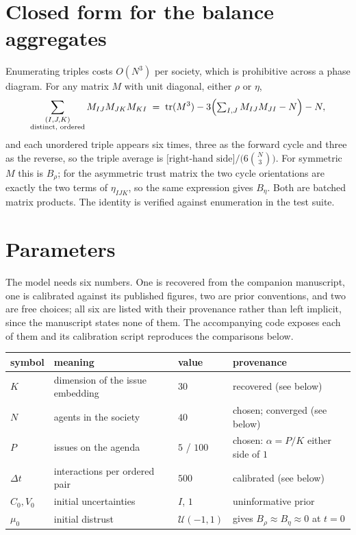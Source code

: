 \documentclass{article}
\newcommand{\Brho}{B_{\rho}}
\newcommand{\Beta}{B_{\eta}}
\begin{document}
\section{Closed form for the balance aggregates}
\label{app:closed-form}

Enumerating triples costs $O(N^{3})$ per society, which is prohibitive across a
phase diagram. For any matrix $M$ with unit diagonal, either $\rho$ or $\eta$,
%
\begin{equation}
  \sum_{\substack{(I,J,K)\\ \text{distinct, ordered}}} M_{IJ}M_{JK}M_{KI}
  \;=\; \operatorname{tr}(M^{3}) - 3\Bigl(\textstyle\sum_{I,J}M_{IJ}M_{JI} - N\Bigr) - N ,
\end{equation}
%
and each unordered triple appears six times, three as the forward cycle and three
as the reverse, so
the triple average is $\bigl[\text{right-hand side}\bigr]/\bigl(6\binom{N}{3}\bigr)$.
For symmetric $M$ this is $\Brho$; for the asymmetric trust matrix the two cycle
orientations are exactly the two terms of $\eta_{IJK}$, so the same expression gives
$\Beta$. Both are batched matrix products. The identity is verified against
enumeration in the test suite.

\section{Parameters}
\label{app:parameters}

The model needs six numbers. One is recovered from the companion manuscript, one
is calibrated against its published figures, two are prior conventions, and two
are free choices; all six are listed with their provenance rather than left
implicit, since the manuscript states none of them. The accompanying code exposes
each of them and its calibration script reproduces the comparisons below.

\begin{table}[h]
\centering\small
\begin{tabular}{llll}
\toprule
symbol & meaning & value & provenance \\
\midrule
$K$ & dimension of the issue embedding & $30$ & recovered (see below) \\
$N$ & agents in the society & $40$ & chosen; converged (see below) \\
$P$ & issues on the agenda & $5$ / $100$ & chosen: $\alpha=P/K$ either side of $1$ \\
$\Delta t$ & interactions per ordered pair & $500$ & calibrated (see below) \\
$C_0, V_0$ & initial uncertainties & $I$, $1$ & uninformative prior \\
$\mu_0$ & initial distrust & $\mathcal{U}(-1,1)$ & gives $\Brho\approx\Beta\approx0$ at $t=0$ \\
\bottomrule
\end{tabular}
\end{table}
\end{document}
